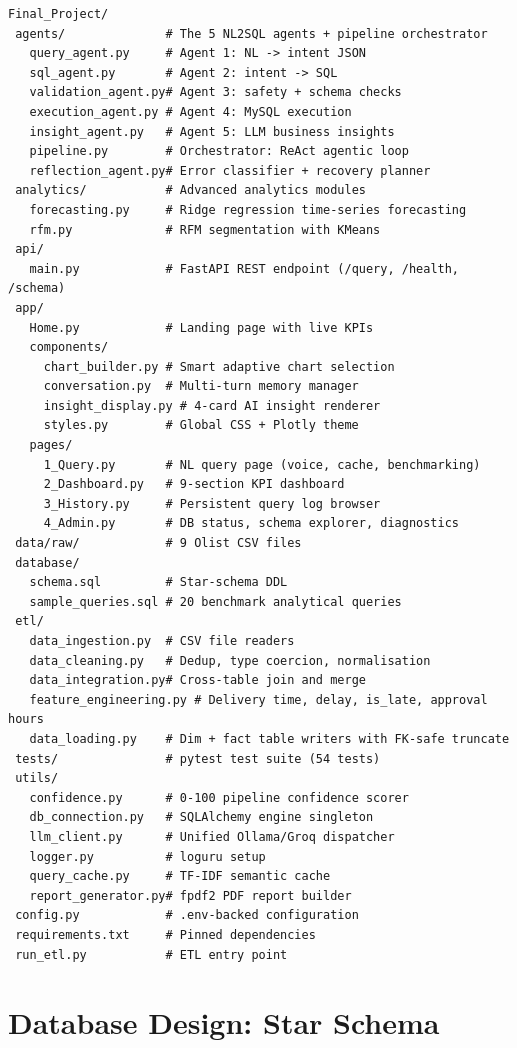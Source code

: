 \documentclass[12pt,a4paper]{report}
\begin{document}
\begin{lstlisting}[style=sqlcode, caption={Full project directory layout}, label={lst:tree}]
Final_Project/
 agents/              # The 5 NL2SQL agents + pipeline orchestrator
   query_agent.py     # Agent 1: NL -> intent JSON
   sql_agent.py       # Agent 2: intent -> SQL
   validation_agent.py# Agent 3: safety + schema checks
   execution_agent.py # Agent 4: MySQL execution
   insight_agent.py   # Agent 5: LLM business insights
   pipeline.py        # Orchestrator: ReAct agentic loop
   reflection_agent.py# Error classifier + recovery planner
 analytics/           # Advanced analytics modules
   forecasting.py     # Ridge regression time-series forecasting
   rfm.py             # RFM segmentation with KMeans
 api/
   main.py            # FastAPI REST endpoint (/query, /health, /schema)
 app/
   Home.py            # Landing page with live KPIs
   components/
     chart_builder.py # Smart adaptive chart selection
     conversation.py  # Multi-turn memory manager
     insight_display.py # 4-card AI insight renderer
     styles.py        # Global CSS + Plotly theme
   pages/
     1_Query.py       # NL query page (voice, cache, benchmarking)
     2_Dashboard.py   # 9-section KPI dashboard
     3_History.py     # Persistent query log browser
     4_Admin.py       # DB status, schema explorer, diagnostics
 data/raw/            # 9 Olist CSV files
 database/
   schema.sql         # Star-schema DDL
   sample_queries.sql # 20 benchmark analytical queries
 etl/
   data_ingestion.py  # CSV file readers
   data_cleaning.py   # Dedup, type coercion, normalisation
   data_integration.py# Cross-table join and merge
   feature_engineering.py # Delivery time, delay, is_late, approval hours
   data_loading.py    # Dim + fact table writers with FK-safe truncate
 tests/               # pytest test suite (54 tests)
 utils/
   confidence.py      # 0-100 pipeline confidence scorer
   db_connection.py   # SQLAlchemy engine singleton
   llm_client.py      # Unified Ollama/Groq dispatcher
   logger.py          # loguru setup
   query_cache.py     # TF-IDF semantic cache
   report_generator.py# fpdf2 PDF report builder
 config.py            # .env-backed configuration
 requirements.txt     # Pinned dependencies
 run_etl.py           # ETL entry point
\end{lstlisting}

\chapter{Database Design: Star Schema}
\label{ch:database}
\end{document}
